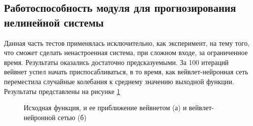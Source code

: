 \documentclass[utf8,usehyperref,14pt]{G7-32}
\begin{document}
\subsection{Работоспособность модуля для прогнозирования нелинейной системы}
Данная часть тестов применялась исключительно, как эксперимент, на тему того, что сможет сделать ненастроенная система, при сложном входе, за ограниченное время. Результаты оказались достаточно предсказуемыми. За 100 итераций вейвнет успел начать приспосабливаться, в то время, как вейвлет-нейронная сеть переместила случайные колебания к среднему значению выходной функции. Результаты представлены на рисунке \ref{test_3_result}
\begin{figure}[H]
\begin{minipage}[h]{0.49\linewidth}
\end{minipage}
\hfill
\begin{minipage}[h]{0.49\linewidth}
\end{minipage}
\caption{Исходная функция, и ее приближение вейвнетом (а) и вейвлет-нейронной сетью (б)}
\label{test_3_result}
\end{figure}
\end{document}
